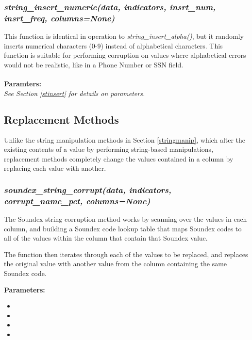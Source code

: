 \documentclass[titlepage, 11pt]{article}
\begin{document}
\subsubsection{\textit{string\_insert\_numeric(data, indicators, insrt\_num, insrt\_freq, columns=None)}}
This function is identical in operation to \textit{string\_insert\_alpha()}, but it randomly inserts numerical characters (0-9) instead of alphabetical characters. This function is suitable for performing corruption on values where alphabetical errors would not be realistic, like in a Phone Number or SSN field.
\\
\\
\textbf{Paramters:}
\\
\textit{See Section \ref{stinsert} for details on parameters.}

\subsection{Replacement Methods}
Unlike the string manipulation methods in Section \ref{stringmanip}, which alter the existing contents of a value by performing string-based manipulations, replacement methods completely change the values contained in a column by replacing each value with another.

\subsubsection{\textit{soundex\_string\_corrupt(data, indicators, corrupt\_name\_pct, columns=None)}}

The Soundex string corruption method works by scanning over the values in each column, and building a Soundex code lookup table that maps Soundex codes to all of the values within the column that contain that Soundex value. 

The function then iterates through each of the values to be replaced, and replaces the original value with another value from the column containing the same Soundex code.

\textbf{Parameters:}
\begin{itemize}
    \item \docdata
    \item \docindc
    \item {}
    \item \doccols
\end{itemize}
\end{document}

